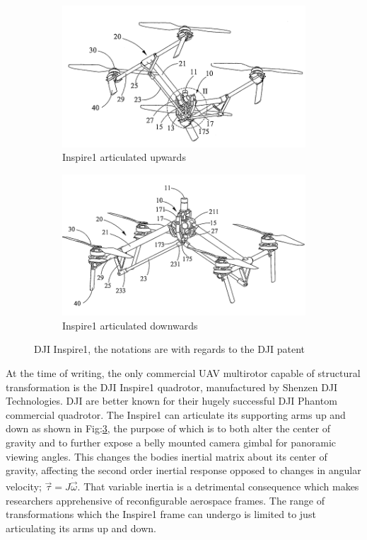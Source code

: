 \begin{figure}[hbtp]
\centering
\begin{subfigure}{.5\textwidth}
\centering
\includegraphics[width=\textwidth]{figs/dji-inspire1}
\caption{Inspire1 articulated upwards}
\label{fig:inspireup}
\end{subfigure}%
\begin{subfigure}{.5\textwidth}
\centering
\includegraphics[width=\textwidth]{figs/dji-inspire2}
\caption{Inspire1 articulated downwards}
\label{fig:inspiredown}
\end{subfigure}
\caption{DJI Inspire1, the notations are with regards to the DJI patent \cite{djinspire}}
\label{fig:inspire1}
\end{figure}
At the time of writing, the only commercial UAV multirotor capable of structural transformation is the DJI Inspire1 quadrotor\cite{inspire}, manufactured by Shenzen DJI Technologies. DJI are better known for their hugely successful DJI Phantom commercial quadrotor\cite{phantom}. The Inspire1 can articulate its supporting arms up and down as shown in Fig:\ref{fig:inspire1}, the purpose of which is to both alter the center of gravity and to further expose a belly mounted camera gimbal for panoramic viewing angles. This changes the bodies inertial matrix about its center of gravity, affecting the second order inertial response opposed to changes in angular velocity; $\vec{\tau}=J\dot{\vec{\omega}}$. That variable inertia is a detrimental consequence which makes researchers apprehensive of reconfigurable aerospace frames. The range of transformations which the Inspire1 frame can undergo is limited to just articulating its arms up and down.
